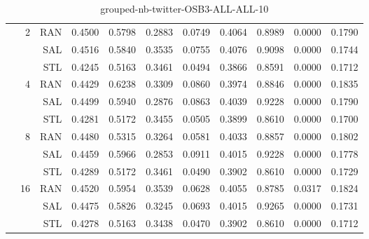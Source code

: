 \begin{center}
\begin{table}[htbp]
\begin{center}
\begin{tabular}{ | r | r | r | r | r | r | r | r | r | r | r |}
 & \multirow{3}{*}{2} & RAN & 0.4500 & 0.5798 & 0.2883 & 0.0749 & 0.4064 & 0.8989 & 0.0000 & 0.1790\\ \cline{3-11}
 &   & SAL & 0.4516 & 0.5840 & 0.3535 & 0.0755 & 0.4076 & 0.9098 & 0.0000 & 0.1744\\ \cline{3-11}
 &   & STL & 0.4245 & 0.5163 & 0.3461 & 0.0494 & 0.3866 & 0.8591 & 0.0000 & 0.1712\\ \cline{2-11}
 & \multirow{3}{*}{4} & RAN & 0.4429 & 0.6238 & 0.3309 & 0.0860 & 0.3974 & 0.8846 & 0.0000 & 0.1835\\ \cline{3-11}
 &   & SAL & 0.4499 & 0.5940 & 0.2876 & 0.0863 & 0.4039 & 0.9228 & 0.0000 & 0.1790\\ \cline{3-11}
 &   & STL & 0.4281 & 0.5172 & 0.3455 & 0.0505 & 0.3899 & 0.8610 & 0.0000 & 0.1700\\ \cline{2-11}
 & \multirow{3}{*}{8} & RAN & 0.4480 & 0.5315 & 0.3264 & 0.0581 & 0.4033 & 0.8857 & 0.0000 & 0.1802\\ \cline{3-11}
 &   & SAL & 0.4459 & 0.5966 & 0.2853 & 0.0911 & 0.4015 & 0.9228 & 0.0000 & 0.1778\\ \cline{3-11}
 &   & STL & 0.4289 & 0.5172 & 0.3461 & 0.0490 & 0.3902 & 0.8610 & 0.0000 & 0.1729\\ \cline{2-11}
 & \multirow{3}{*}{16} & RAN & 0.4520 & 0.5954 & 0.3539 & 0.0628 & 0.4055 & 0.8785 & 0.0317 & 0.1824\\ \cline{3-11}
 &   & SAL & 0.4475 & 0.5826 & 0.3245 & 0.0693 & 0.4015 & 0.9265 & 0.0000 & 0.1731\\ \cline{3-11}
 &   & STL & 0.4278 & 0.5163 & 0.3438 & 0.0470 & 0.3902 & 0.8610 & 0.0000 & 0.1712\\ \cline{2-11}
\hline
\end{tabular}
\caption{grouped-nb-twitter-OSB3-ALL-ALL-10}
\end{center}
 \end{table}
\end{center}

